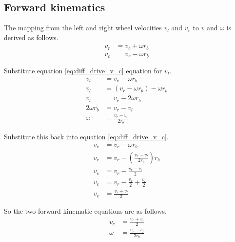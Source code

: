 \subsection{Forward kinematics}

The mapping from the left and right wheel velocities $v_l$ and $v_r$ to $v$ and
$\omega$ is derived as follows.
\begin{align}
  v_r &= v_c + \omega r_b \nonumber \\
  v_c &= v_r - \omega r_b \label{eq:diff_drive_v_c}
\end{align}

Substitute equation \eqref{eq:diff_drive_v_c} equation for $v_l$.
\begin{align*}
  v_l &= v_c - \omega r_b \\
  v_l &= (v_r - \omega r_b) - \omega r_b \\
  v_l &= v_r - 2\omega r_b \\
  2\omega r_b &= v_r - v_l \\
  \omega &= \frac{v_r - v_l}{2 r_b}
\end{align*}

Substitute this back into equation \eqref{eq:diff_drive_v_c}.
\begin{align*}
  v_c &= v_r - \omega r_b \\
  v_c &= v_r - \left(\frac{v_r - v_l}{2 r_b}\right) r_b \\
  v_c &= v_r - \frac{v_r - v_l}{2} \\
  v_c &= v_r - \frac{v_r}{2} + \frac{v_l}{2} \\
  v_c &= \frac{v_r + v_l}{2}
\end{align*}

So the two forward kinematic equations are as follows.
\begin{align}
  v_c &= \frac{v_r + v_l}{2} \\
  \omega &= \frac{v_r - v_l}{2 r_b}
\end{align}
